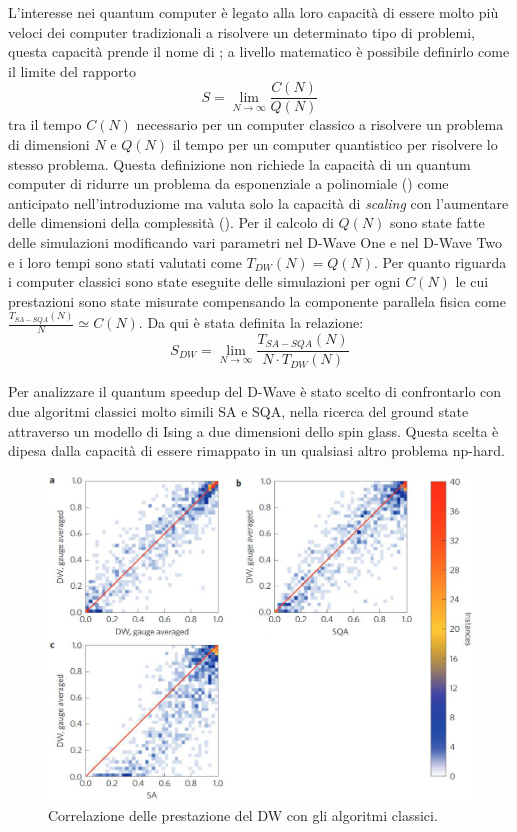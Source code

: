 
L'interesse nei quantum computer è legato alla loro capacità di essere molto più veloci dei computer tradizionali a risolvere un determinato tipo di problemi, questa capacità prende il nome di ; a livello matematico è possibile definirlo\cite{DDQS} come il limite del rapporto
$$S = \lim_{N \to \infty} \frac{C(N)}{Q(N)}$$
tra il tempo $C(N)$ necessario per un computer classico a risolvere un problema di dimensioni $N$ e $Q(N)$ il tempo per un computer quantistico per risolvere lo stesso problema. Questa definizione non richiede la capacità di un quantum computer di ridurre un problema da esponenziale a polinomiale () come anticipato nell'introduziome ma valuta solo la capacità di \textit{scaling} con l'aumentare delle dimensioni della complessità ().
Per il calcolo di $Q(N)$ sono state fatte delle simulazioni modificando vari parametri nel D-Wave One e nel D-Wave Two e i loro tempi sono stati valutati come $T_{DW}(N) = Q(N)$. Per quanto riguarda i computer classici sono state eseguite delle simulazioni per ogni $C(N)$ le cui prestazioni sono state misurate compensando la componente parallela fisica\cite{EQA} come $\frac{T_{SA-SQA}(N)}{N} \simeq C(N)$.
Da qui è stata definita\cite{DDQS} la relazione:
$$S_{DW} = \lim_{N \to \infty} \frac{T_{SA-SQA}(N)}{N \cdot T_{DW}(N)}$$


\cite{EQA}Per analizzare il quantum speedup del D-Wave è stato scelto di confrontarlo con due algoritmi classici molto simili SA e SQA, nella ricerca del ground state attraverso un modello di Ising a due dimensioni dello spin glass.
Questa scelta è dipesa dalla capacità di essere rimappato in un qualsiasi altro problema np-hard.

\begin{figure}[htbp]
  \centering
  \includegraphics[scale=0.5]{Immagini/correlazione-2-dw.jpg}
  \caption{Correlazione delle prestazione del DW con gli algoritmi classici.}
  \label{figura:correlazione-2-dw}
\end{figure}

